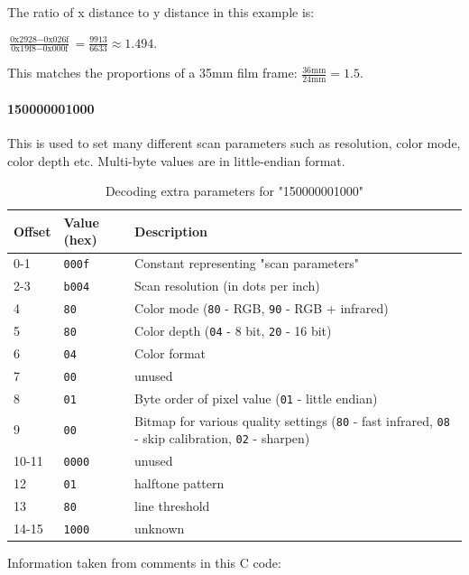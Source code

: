 \documentclass{article}
\begin{document}
The ratio of x distance to y distance in this example is:

$\frac{\textrm{0x2928} - \textrm{0x026f}}{\textrm{0x19f8} - \textrm{0x000f}} = \frac{9913}{6633} \approx 1.494$.

This matches the proportions of a 35mm film frame: $\frac{36 \textrm{mm}}{24 \textrm{mm}} = 1.5$.

\paragraph{150000001000} This is used to set many different scan parameters
such as resolution, color mode, color depth etc. Multi-byte
values are in little-endian format.

\begin{table}[H]
  \caption{Decoding extra parameters for "150000001000"}
  \centering
  \begin{tabularx}{\textwidth}{p{1cm} | p{1cm} | X}
    Offset & Value (hex) & Description \\ \hline
    0-1 & {\tt 000f} & Constant representing "scan parameters" \\
    2-3 & {\tt b004} & Scan resolution (in dots per inch) \\
    4 & {\tt 80} & Color mode ({\tt 80} - RGB, {\tt 90} - RGB + infrared) \\
    5 & {\tt 80} & Color depth ({\tt 04} - 8 bit, {\tt 20} - 16 bit) \\
    6 & {\tt 04} & Color format \\
    7 & {\tt 00} & unused \\
    8 & {\tt 01} & Byte order of pixel value ({\tt 01} - little endian) \\
    9 & {\tt 00} & Bitmap for various quality settings ({\tt 80} - fast infrared,
                                                        {\tt 08} - skip calibration,
                                                        {\tt 02} - sharpen) \\
    10-11 & {\tt 0000} & unused \\
    12 & {\tt 01} & halftone pattern \\
    13 & {\tt 80} & line threshold \\
    14-15 & {\tt 1000} & unknown \\
  \end{tabularx}
  
  \vspace{5mm}
  Information taken from comments in this C code: \cite[\texttt{pieusb\_scancmd.c}]{sane_code}
  \label{table:param15}
\end{table}
\end{document}
